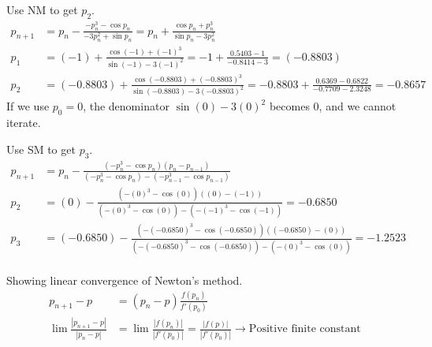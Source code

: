 \documentclass[newpage]{homework}
\begin{document}
\maketitle

\question
Use NM to get $p_2$.
\begin{align*}
	p_{n+1}    &=	p_n - \frac{-p_n^3 - \cos p_n}{-3p_n^2 + \sin p_n}
	= p_n + \frac{\cos p_n + p_n^3}{\sin p_n - 3p_n^2}  \\
	p_1    &=	(-1) + \frac{\cos (-1) + (-1)^3}{\sin (-1) - 3(-1)^2}
	=	-1 + \frac{0.5403 - 1}{-0.8414 - 3}
	=	(-0.8803)	\\
	p_2	&=	(-0.8803) + \frac{\cos (-0.8803) + (-0.8803)^3}{\sin (-0.8803) - 3(-0.8803)^2}
	= -0.8803 + \frac{0.6369 - 0.6822}{-0.7709 - 2.3248}
	= \boxed{-0.8657}
\end{align*}
If we use $p_0 = 0$, the denominator $\sin(0) - 3(0)^2$ becomes 0, and we cannot iterate.

\question
Use SM to get $p_3$.
\begin{align*}
	p_{n+1}	&=	p_n - \frac{(-p_n^3 - \cos p_n)(p_n - p_{n-1})}{(-p_n^3 - \cos p_n) - (-p_{n-1}^3 - \cos p_{n-1})}	\\
	p_2	&=	(0) - \frac{(-(0)^3 - \cos (0))((0) - (-1))}{(-(0)^3 - \cos (0)) - (-(-1)^3 - \cos (-1))}	=	-0.6850	\\
	p_3	&=	(-0.6850) - \frac{(-(-0.6850)^3 - \cos (-0.6850))((-0.6850) - (0))}{(-(-0.6850)^3 - \cos (-0.6850)) - (-(0)^3 - \cos (0))} = \boxed{-1.2523}	\\
\end{align*}

\question
Showing linear convergence of Newton's method.
\begin{align*}
	p_{n+1}-p	&=	(p_n-p) \frac{f(p_n)}{f'(p_0)}	\\
	\lim \frac{|p_{n+1}-p|}{|p_n-p|} &= \lim \frac{|f(p_n)|}{|f'(p_0)|} = \frac{|f(p)|}{|f'(p_0)|} \rightarrow \text{Positive finite constant}
\end{align*}
\end{document}
